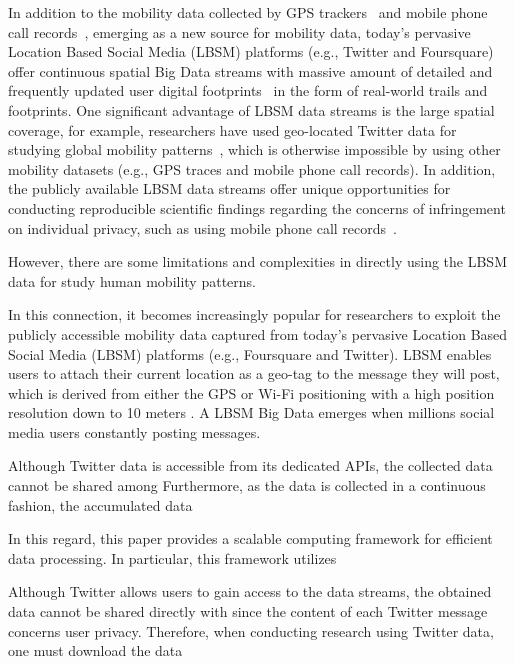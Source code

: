 \documentclass[a4paper,11pt]{article}
\begin{document}
In addition to the mobility data collected by GPS trackers~\cite{zheng2008understanding, rhee2011levy} and mobile phone call records~\cite{gonzalez2008understanding,sevtsuk2010does,kung2014exploring}, 
emerging as a new source for mobility data, today's pervasive Location Based Social Media (LBSM) platforms (e.g., Twitter and Foursquare) offer continuous spatial Big Data streams with massive amount of detailed and frequently updated user digital footprints~\cite{thatcher2014living} in the form of real-world trails and footprints.
One significant advantage of LBSM data streams is the large spatial coverage, for example, researchers have used geo-located Twitter data for studying global mobility patterns~\cite{hawelka2014geo}, which is otherwise impossible by using other mobility datasets (e.g., GPS traces and mobile phone call records). 
In addition, the publicly available LBSM data streams offer unique opportunities for conducting reproducible scientific findings regarding the concerns of infringement on individual privacy, such as using mobile phone call records~\cite{giannotti2008mobility,crampton2014collect,Jurdak2015}.



However, there are some limitations and complexities in directly using the LBSM data for study human mobility patterns. 

In this connection, it becomes increasingly popular for researchers to exploit the publicly accessible mobility data captured from today's pervasive Location Based Social Media (LBSM) platforms (e.g., Foursquare and Twitter).
LBSM enables users to attach their current location as a geo-tag to the message they will post, which is derived from either the GPS or Wi-Fi positioning with a high position resolution down to 10 meters \cite{Jurdak2015}.
A LBSM Big Data emerges when millions social media users constantly posting messages.


Although Twitter data is accessible from its dedicated APIs, the collected data cannot be shared among
Furthermore, as the data is collected in a continuous fashion, the accumulated data

In this regard, this paper provides a scalable computing framework for efficient data processing.
In particular, this framework utilizes 

Although Twitter allows users to gain access to the data streams, the obtained data cannot be shared directly with 
since the content of each Twitter message concerns user privacy. Therefore, when conducting research using Twitter data, one must download the data
\end{document}
